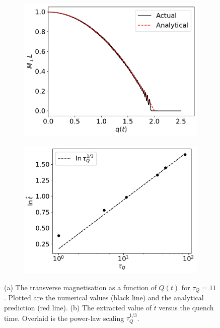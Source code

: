 \begin{figure}
    \centering
    \begin{subfigure}{0.49\textwidth}
        \includegraphics[width=\textwidth]{gfx/ch-spin1/magnetisation_vs_Q.pdf}
        \caption{\label{subfig: magnetisation-vs-Q}}
    \end{subfigure}
    \begin{subfigure}{0.49\textwidth}
        \includegraphics[width=\textwidth]{gfx/ch-spin1/t-hat_vs_tau_q.pdf}
        \caption{\label{subfig: t-hat-vs-tau-q}}
    \end{subfigure}
    \caption[Transverse magnetisation for as a function of quench parameter,
        \(Q\)]
    {(a) The transverse magnetisation as a function of \( Q(t) \) for
        \(\tau_Q=11\).
        Plotted are the numerical values (black line) and the
        analytical prediction (red line).
        (b) The extracted value of \( \tilde{t} \) versus the quench time.
        Overlaid is the power-law scaling \(\tau_Q^{1/3}\).}
\end{figure}
